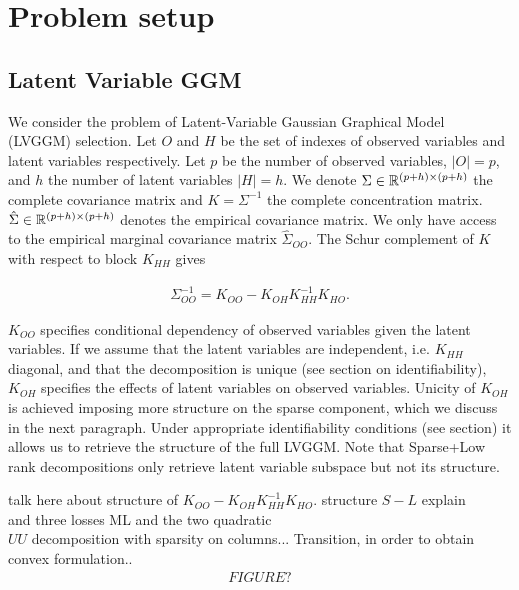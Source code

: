 \section{Problem setup}
\label{setup}

\subsection{Latent Variable GGM}
We consider the problem of Latent-Variable Gaussian Graphical Model (LVGGM) selection. Let $O$ and $H$ be the set of indexes of observed variables and latent variables respectively. Let $p$ be the number of observed variables, $|O|=p$, and  $h$ the number of latent variables $|H|=h$. We denote $\Sigma\in\mathbb{R}^{(p+h)\times(p+h)}$ the complete covariance matrix and $K=\Sigma^{-1}$ the complete concentration matrix. $\hat{\Sigma}\in\mathbb{R}^{(p+h)\times(p+h)}$ denotes the empirical covariance matrix. We only have access to the empirical marginal covariance matrix $\hat{\Sigma}_{OO}$. The Schur complement of $K$ with respect to block $K_{HH}$ gives 

\begin{align}
\Sigma_{OO}^{-1} = K_{OO}-K_{OH}K_{HH}^{-1}K_{HO}.
\end{align}

$K_{OO}$ specifies conditional dependency of observed variables given the latent variables. If we assume that the latent variables are independent, i.e. $K_{HH}$ diagonal, and that the decomposition is unique (see section on identifiability), $K_{OH}$ specifies the effects of latent variables on observed variables. Unicity of $K_{OH}$ is achieved imposing more structure on the sparse component, which we discuss in the next paragraph. Under appropriate identifiability conditions (see section) it allows us to retrieve the structure of the full LVGGM. Note that Sparse+Low rank decompositions only retrieve latent variable subspace but not its structure.

talk here about structure of $K_{OO}-K_{OH}K_{HH}^{-1}K_{HO}.$  structure $S-L$ explain\\

and three losses ML and the two quadratic\\

$UU$ decomposition with sparsity on columns... Transition, in order to obtain convex formulation..\\

\begin{align}
FIGURE ?
\end{align}

